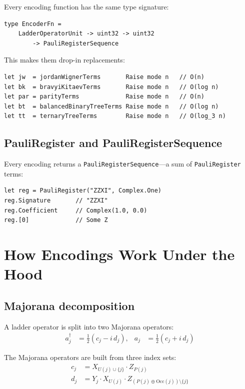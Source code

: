 \documentclass[10pt,a4paper]{article}
\begin{document}
Every encoding function has the same type signature:

\begin{lstlisting}
type EncoderFn =
    LadderOperatorUnit -> uint32 -> uint32
        -> PauliRegisterSequence
\end{lstlisting}

This makes them drop-in replacements:

\begin{lstlisting}
let jw  = jordanWignerTerms       Raise mode n   // O(n)
let bk  = bravyiKitaevTerms       Raise mode n   // O(log n)
let par = parityTerms             Raise mode n   // O(n)
let bt  = balancedBinaryTreeTerms Raise mode n   // O(log n)
let tt  = ternaryTreeTerms        Raise mode n   // O(log_3 n)
\end{lstlisting}

\subsection{PauliRegister and PauliRegisterSequence}

Every encoding returns a \texttt{PauliRegisterSequence}---a sum of
\texttt{PauliRegister} terms:

\begin{lstlisting}
let reg = PauliRegister("ZZXI", Complex.One)
reg.Signature       // "ZZXI"
reg.Coefficient     // Complex(1.0, 0.0)
reg.[0]             // Some Z
\end{lstlisting}


\section{How Encodings Work Under the Hood}\label{ch:internals}

\subsection{Majorana decomposition}

A ladder operator is split into two Majorana operators:
%
\begin{align}
a^\dagger_j &= \tfrac{1}{2}(c_j - i\,d_j), &
a_j &= \tfrac{1}{2}(c_j + i\,d_j)
\end{align}

The Majorana operators are built from three index sets:
%
\begin{align}
c_j &= X_{U(j) \cup \{j\}} \cdot Z_{P(j)} \\
d_j &= Y_j \cdot X_{U(j)} \cdot Z_{(P(j) \oplus \text{Occ}(j)) \setminus \{j\}}
\end{align}
\end{document}
